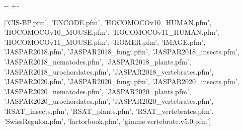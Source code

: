 \documentclass[letterpaper,10pt,english]{sphinxmanual}
\newlength\nbsphinxcodecellspacing
\begin{document}
{

\kern-\sphinxverbatimsmallskipamount\kern-\baselineskip
\kern+\FrameHeightAdjust\kern-\fboxrule
\vspace{\nbsphinxcodecellspacing}

\begin{sphinxVerbatim}[commandchars=\\\{\}]
\llap{\color{nbsphinxout}[9]:\,\hspace{\fboxrule}\hspace{\fboxsep}}['CIS-BP.pfm',
 'ENCODE.pfm',
 'HOCOMOCOv10\_HUMAN.pfm',
 'HOCOMOCOv10\_MOUSE.pfm',
 'HOCOMOCOv11\_HUMAN.pfm',
 'HOCOMOCOv11\_MOUSE.pfm',
 'HOMER.pfm',
 'IMAGE.pfm',
 'JASPAR2018.pfm',
 'JASPAR2018\_fungi.pfm',
 'JASPAR2018\_insects.pfm',
 'JASPAR2018\_nematodes.pfm',
 'JASPAR2018\_plants.pfm',
 'JASPAR2018\_urochordates.pfm',
 'JASPAR2018\_vertebrates.pfm',
 'JASPAR2020.pfm',
 'JASPAR2020\_fungi.pfm',
 'JASPAR2020\_insects.pfm',
 'JASPAR2020\_nematodes.pfm',
 'JASPAR2020\_plants.pfm',
 'JASPAR2020\_urochordates.pfm',
 'JASPAR2020\_vertebrates.pfm',
 'RSAT\_insects.pfm',
 'RSAT\_plants.pfm',
 'RSAT\_vertebrates.pfm',
 'SwissRegulon.pfm',
 'factorbook.pfm',
 'gimme.vertebrate.v5.0.pfm']
\end{sphinxVerbatim}
}

{
\begin{sphinxVerbatim}[commandchars=\\\{\}]
\llap{\color{nbsphinxin}[10]:\,\hspace{\fboxrule}\hspace{\fboxsep}}
   

   
  

\PYG{p}{[}\PYG{p}{]}
\end{sphinxVerbatim}
}
\end{document}
